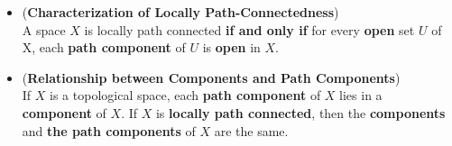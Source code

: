 \documentclass[11pt]{article}
\begin{document}
\begin{itemize}
\item \begin{proposition} (\textbf{Characterization of Locally Path-Connectedness}) \citep{munkres2000topology}\\
A space $X$ is locally path connected \textbf{if and only if} for every \textbf{open} set $U$ of X, each \textbf{path component} of $U$ is \textbf{open} in $X$.
\end{proposition}

\item \begin{proposition} (\textbf{Relationship between Components and Path Components})\\
If $X$ is a topological space, each \textbf{path component} of $X$ lies in a \textbf{component} of $X$. If $X$ is \textbf{locally path connected}, then the \textbf{components} and \textbf{the path components} of $X$ are the same.
\end{proposition}
\end{itemize}
\end{document}
